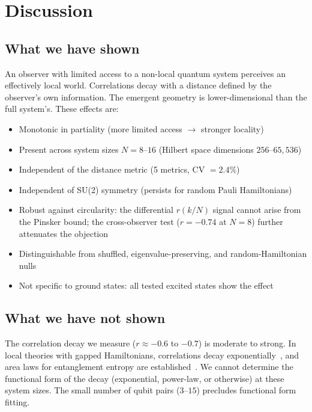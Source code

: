\documentclass[aps,pra,twocolumn,superscriptaddress]{revtex4-2}
\begin{document}
\section{Discussion}
\label{sec:discussion}

\subsection{What we have shown}

An observer with limited access to a non-local quantum system perceives an effectively local world. Correlations decay with a distance defined by the observer's own information. The emergent geometry is lower-dimensional than the full system's. These effects are:
\begin{itemize}
\item Monotonic in partiality (more limited access $\to$ stronger locality)
\item Present across system sizes $N = 8$--$16$ (Hilbert space dimensions $256$--$65{,}536$)
\item Independent of the distance metric (5 metrics, CV $= 2.4\%$)
\item Independent of SU(2) symmetry (persists for random Pauli Hamiltonians)
\item Robust against circularity: the differential $r(k/N)$ signal cannot arise from the Pinsker bound; the cross-observer test ($r = -0.74$ at $N = 8$) further attenuates the objection
\item Distinguishable from shuffled, eigenvalue-preserving, and random-Hamiltonian nulls
\item Not specific to ground states: all tested excited states show the effect
\end{itemize}

\subsection{What we have not shown}

The correlation decay we measure ($r \approx -0.6$ to $-0.7$) is moderate to strong. In local theories with gapped Hamiltonians, correlations decay exponentially~\cite{hastings2006}, and area laws for entanglement entropy are established~\cite{wolf2008,brandao2013}. We cannot determine the functional form of the decay (exponential, power-law, or otherwise) at these system sizes. The small number of qubit pairs ($3$--$15$) precludes functional form fitting.
\end{document}
